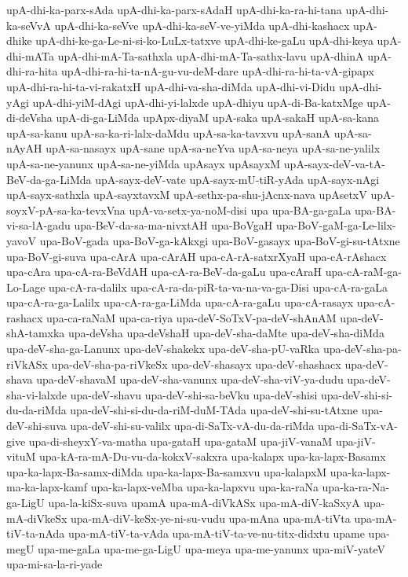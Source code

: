 {upA-dhi-ka-parx-sAda
upA-dhi-ka-parx-sAdaH
upA-dhi-ka-ra-hi-tana
upA-dhi-ka-seVvA
upA-dhi-ka-seVve
upA-dhi-ka-seV-ve-yiMda
upA-dhi-kashacx
upA-dhike
upA-dhi-ke-ga-Le-ni-si-ko-LuLx-tatxve
upA-dhi-ke-gaLu
upA-dhi-keya
upA-dhi-mATa
upA-dhi-mA-Ta-sathxla
upA-dhi-mA-Ta-sathx-lavu
upA-dhinA
upA-dhi-ra-hita
upA-dhi-ra-hi-ta-nA-gu-vu-deM-dare
upA-dhi-ra-hi-ta-vA-gipapx
upA-dhi-ra-hi-ta-vi-rakatxH
upA-dhi-va-sha-diMda
upA-dhi-vi-Didu
upA-dhi-yAgi
upA-dhi-yiM-dAgi
upA-dhi-yi-lalxde
upA-dhiyu
upA-di-Ba-katxMge
upA-di-deVsha
upA-di-ga-LiMda
upApx-diyaM
upA-saka
upA-sakaH
upA-sa-kana
upA-sa-kanu
upA-sa-ka-ri-lalx-daMdu
upA-sa-ka-tavxvu
upA-sanA
upA-sa-nAyAH
upA-sa-nasayx
upA-sane
upA-sa-neYva
upA-sa-neya
upA-sa-ne-yalilx
upA-sa-ne-yanunx
upA-sa-ne-yiMda
upAsayx
upAsayxM
upA-sayx-deV-va-tA-BeV-da-ga-LiMda
upA-sayx-deV-vate
upA-sayx-mU-tiR-yAda
upA-sayx-nAgi
upA-sayx-sathxla
upA-sayxtavxM
upA-sethx-pa-shu-jAcnx-nava
upAsetxV
upA-soyxV-pA-sa-ka-tevxVna
upA-va-setx-ya-noM-disi
upa
upa-BA-ga-gaLa
upa-BA-vi-sa-lA-gadu
upa-BeV-da-sa-ma-nivxtAH
upa-BoVgaH
upa-BoV-gaM-ga-Le-lilx-yavoV
upa-BoV-gada
upa-BoV-ga-kAkxgi
upa-BoV-gasayx
upa-BoV-gi-su-tAtxne
upa-BoV-gi-suva
upa-cArA
upa-cArAH
upa-cA-rA-satxrXyaH
upa-cA-rAshacx
upa-cAra
upa-cA-ra-BeVdAH
upa-cA-ra-BeV-da-gaLu
upa-cAraH
upa-cA-raM-ga-Lo-Lage
upa-cA-ra-dalilx
upa-cA-ra-da-piR-ta-va-na-va-ga-Disi
upa-cA-ra-gaLa
upa-cA-ra-ga-Lalilx
upa-cA-ra-ga-LiMda
upa-cA-ra-gaLu
upa-cA-rasayx
upa-cA-rashacx
upa-ca-raNaM
upa-ca-riya
upa-deV-SoTxV-pa-deV-shAnAM
upa-deV-shA-tamxka
upa-deVsha
upa-deVshaH
upa-deV-sha-daMte
upa-deV-sha-diMda
upa-deV-sha-ga-Lanunx
upa-deV-shakekx
upa-deV-sha-pU-vaRka
upa-deV-sha-pa-riVkASx
upa-deV-sha-pa-riVkeSx
upa-deV-shasayx
upa-deV-shashacx
upa-deV-shava
upa-deV-shavaM
upa-deV-sha-vanunx
upa-deV-sha-viV-ya-dudu
upa-deV-sha-vi-lalxde
upa-deV-shavu
upa-deV-shi-sa-beVku
upa-deV-shisi
upa-deV-shi-si-du-da-riMda
upa-deV-shi-si-du-da-riM-duM-TAda
upa-deV-shi-su-tAtxne
upa-deV-shi-suva
upa-deV-shi-su-valilx
upa-di-SaTx-vA-du-da-riMda
upa-di-SaTx-vA-give
upa-di-sheyxY-va-matha
upa-gataH
upa-gataM
upa-jiV-vanaM
upa-jiV-vituM
upa-kA-ra-mA-Du-vu-da-kokxV-sakxra
upa-kalapx
upa-ka-lapx-Basamx
upa-ka-lapx-Ba-samx-diMda
upa-ka-lapx-Ba-samxvu
upa-kalapxM
upa-ka-lapx-ma-ka-lapx-kamf
upa-ka-lapx-veMba
upa-ka-lapxvu
upa-ka-raNa
upa-ka-ra-Na-ga-LigU
upa-la-kiSx-suva
upamA
upa-mA-diVkASx
upa-mA-diV-kaSxyA
upa-mA-diVkeSx
upa-mA-diV-keSx-ye-ni-su-vudu
upa-mAna
upa-mA-tiVta
upa-mA-tiV-ta-nAda
upa-mA-tiV-ta-vAda
upa-mA-tiV-ta-ve-nu-titx-didxtu
upame
upa-megU
upa-me-gaLa
upa-me-ga-LigU
upa-meya
upa-me-yanunx
upa-miV-yateV
upa-mi-sa-la-ri-yade
}
